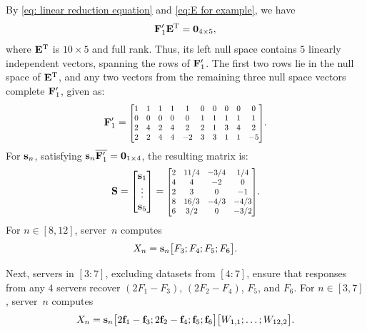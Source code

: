 \documentclass[conference,letterpaper]{IEEEtran}
\begin{document}
\begin{example}

By \eqref{eq: linear reduction equation} and \eqref{eq:E for example}, we have
\begin{align}
{\bf F}'_1 {\bf E}^{\text{\rm T}} = \mathbf{0}_{4\times 5}, 
\label{eq:equations for example}
\end{align}
where ${\bf E}^{\text{\rm T}}$ is \(10 \times 5\) and full rank. Thus, its left null space contains \(5\) linearly independent vectors, spanning the rows of ${\bf F}'_1$. The first two rows lie in the null space of ${\bf E}^{\text{\rm T}}$, and any two vectors from the remaining three null space vectors complete ${\bf F}'_1$, given as:
\[
{\bf F}'_1 = 
\scalebox{0.8}{$
\begin{bmatrix}
1 & 1 & 1 & 1 & 1 & 0 & 0 & 0 & 0 & 0 \\
0 & 0 & 0 & 0 & 0 & 1 & 1 & 1 & 1 & 1 \\
2 & 4 & 2 & 4 & 2 & 2 & 1 & 3 & 4 & 2 \\
2 & 2 & 4 & 4 & -2 & 3 & 3 & 1 & 1 & -5
\end{bmatrix}
$}.
\]
For \({\bf s}_n\), satisfying \({\bf s}_n \overline{{\bf F}'_1} = \mathbf{0}_{1 \times 4}\), the resulting matrix is:
\[
{\bf S} = 
\begin{bmatrix}
{\bf s}_{1} \\
\vdots \\
{\bf s}_{5}
\end{bmatrix} =  
\scalebox{0.8}{$
\begin{bmatrix}
 2 & 11/4 & -3/4 & 1/4 \\
 4 & 4 & -2 & 0 \\
 2 & 3 & 0 & -1 \\
 8 & 16/3 & -4/3 & -4/3 \\
 6 & 3/2 & 0 & -3/2 \\
\end{bmatrix}
$}.
\]
For \(n \in [8, 12]\), server~\(n\) computes 
\[
X_n = {\bf s}_n \bigl[F_3; F_4; F_5; F_6\bigr].
\]

Next, servers in \([3{:}7]\), excluding datasets from \([4{:}7]\), ensure that responses from any \(4\) servers recover \((2F_1 - F_3)\), \((2F_2 - F_4)\), \(F_5\), and \(F_6\). For \(n \in [3, 7]\), server~\(n\) computes
\[
X_n = {\bf s}_n \bigl[2{{\bf f}}_1 - {{\bf f}}_3; 2{{\bf f}}_2 - {{\bf f}}_4; {{\bf f}}_5; {{\bf f}}_6\bigr]\bigl[W_{1,1}; \ldots; W_{12,2}\bigr].
\]


\end{example}
\end{document}
